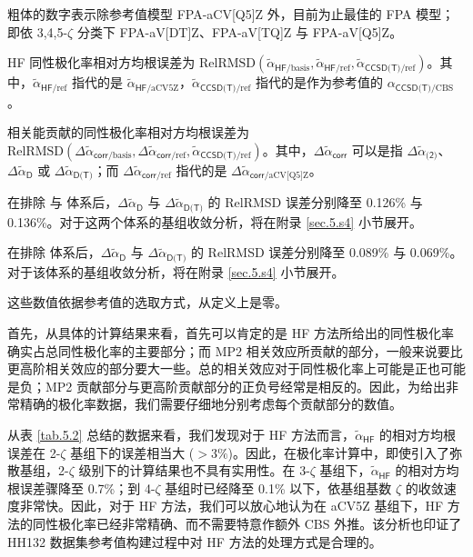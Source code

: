 \begin{table}[ht]
    \raggedright
    \par{} 粗体的数字表示除参考值模型 FPA-aCV[Q5]Z 外，目前为止最佳的 FPA 模型；即依 3,4,5-$\zeta$ 分类下 FPA-aV[DT]Z、FPA-aV[TQ]Z 与 FPA-aV[Q5]Z。
    \par{} HF 同性极化率相对方均根误差为 $\text{RelRMSD} (\tilde \alpha_{\textsf{HF}/\text{basis}}, \tilde \alpha_{\textsf{HF}/\text{ref}}, \tilde \alpha_{\textsf{CCSD(T)}/\text{ref}})$。其中，$\tilde \alpha_{\textsf{HF}/\text{ref}}$ 指代的是 $\tilde \alpha_{\textsf{HF}/\text{aCV5Z}}$，$\tilde \alpha_{\textsf{CCSD(T)}/\text{ref}}$ 指代的是作为参考值的 $\alpha_{\textsf{CCSD(T)}/\text{CBS}}$。
    \par{} 相关能贡献的同性极化率相对方均根误差为 $\text{RelRMSD} (\Delta \tilde \alpha_{\textsf{corr}/\text{basis}}, \Delta \tilde \alpha_{\textsf{corr}/\text{ref}}, \tilde \alpha_{\textsf{CCSD(T)}/\text{ref}})$。其中，$\Delta \tilde \alpha_{\textsf{corr}}$ 可以是指 $\Delta \tilde \alpha_{\textsf{(2)}}$、$\Delta \tilde \alpha_{\textsf{D}}$ 或 $\Delta \tilde \alpha_{\textsf{D(T)}}$；而 $\Delta \tilde \alpha_{\textsf{corr}/\text{ref}}$ 指代的是 $\Delta \tilde \alpha_{\textsf{corr}/\text{aCV[Q5]Z}}$。
    \par{} 在排除  与  体系后，$\Delta \tilde \alpha_\textsf{D}$ 与 $\Delta \tilde \alpha_\textsf{D(T)}$ 的 RelRMSD 误差分别降至 0.126\% 与 0.136\%。对于这两个体系的基组收敛分析，将在附录 \ref{sec.5.s4} 小节展开。
    \par{} 在排除  体系后，$\Delta \tilde \alpha_\textsf{D}$ 与 $\Delta \tilde \alpha_\textsf{D(T)}$ 的 RelRMSD 误差分别降至 0.089\% 与 0.069\%。对于该体系的基组收敛分析，将在附录 \ref{sec.5.s4} 小节展开。
    \par{} 这些数值依据参考值的选取方式，从定义上是零。
\end{table}

首先，从具体的计算结果来看，首先可以肯定的是 HF 方法所给出的同性极化率确实占总同性极化率的主要部分；而 MP2 相关效应所贡献的部分，一般来说要比更高阶相关效应的部分要大一些。总的相关效应对于同性极化率上可能是正也可能是负；MP2 贡献部分与更高阶贡献部分的正负号经常是相反的。因此，为给出非常精确的极化率数据，我们需要仔细地分别考虑每个贡献部分的数值。

从表 \ref{tab.5.2} 总结的数据来看，我们发现对于 HF 方法而言，$\tilde \alpha_\textsf{HF}$ 的相对方均根误差在 2-$\zeta$ 基组下的误差相当大 ($> 3\%$)。因此，在极化率计算中，即使引入了弥散基组，2-$\zeta$ 级别下的计算结果也不具有实用性。在 3-$\zeta$ 基组下，$\tilde \alpha_\textsf{HF}$ 的相对方均根误差骤降至 0.7\%；到 4-$\zeta$ 基组时已经降至 0.1\% 以下，依基组基数 $\zeta$ 的收敛速度非常快。因此，对于 HF 方法，我们可以放心地认为在 aCV5Z 基组下，HF 方法的同性极化率已经非常精确、而不需要特意作额外 CBS 外推。该分析也印证了 HH132 数据集参考值构建过程中对 HF 方法的处理方式是合理的\cite{Hait-Head-Gordon.PCCP.2018}。

